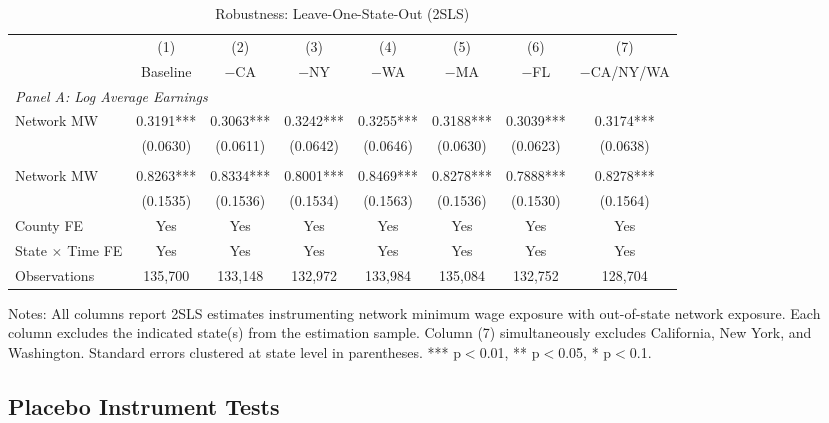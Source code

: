 \documentclass[12pt]{article}
\newenvironment{figurenotes}{\par\vspace{0.5em}\footnotesize\noindent}{\par}
\begin{document}
\begin{table}[H]
\centering
\caption{Robustness: Leave-One-State-Out (2SLS)}
\label{tab:robustB2}
\footnotesize
\setlength{\tabcolsep}{4pt}
\begin{tabular}{l ccccccc}
\toprule
 & (1) & (2) & (3) & (4) & (5) & (6) & (7) \\
 & Baseline & $-$CA & $-$NY & $-$WA & $-$MA & $-$FL & $-$CA/NY/WA \\
\midrule
\multicolumn{8}{l}{\textit{Panel A: Log Average Earnings}} \\[3pt]
Network MW & 0.3191*** & 0.3063*** & 0.3242*** & 0.3255*** & 0.3188*** & 0.3039*** & 0.3174*** \\
 & (0.0630) & (0.0611) & (0.0642) & (0.0646) & (0.0630) & (0.0623) & (0.0638) \\
\addlinespace
\multicolumn{8}{l}{\textit{Panel B: Log Employment}} \\[3pt]
Network MW & 0.8263*** & 0.8334*** & 0.8001*** & 0.8469*** & 0.8278*** & 0.7888*** & 0.8278*** \\
 & (0.1535) & (0.1536) & (0.1534) & (0.1563) & (0.1536) & (0.1530) & (0.1564) \\
\midrule
County FE & Yes & Yes & Yes & Yes & Yes & Yes & Yes \\
State $\times$ Time FE & Yes & Yes & Yes & Yes & Yes & Yes & Yes \\
Observations & 135,700 & 133,148 & 132,972 & 133,984 & 135,084 & 132,752 & 128,704 \\
\bottomrule
\end{tabular}
\begin{figurenotes}
Notes: All columns report 2SLS estimates instrumenting network minimum wage exposure with
out-of-state network exposure. Each column excludes the indicated state(s) from the estimation
sample. Column (7) simultaneously excludes California, New York, and Washington.
Standard errors clustered at state level in parentheses.
*** p$<$0.01, ** p$<$0.05, * p$<$0.1.
\end{figurenotes}
\end{table}

\subsection{Placebo Instrument Tests}
\end{document}
